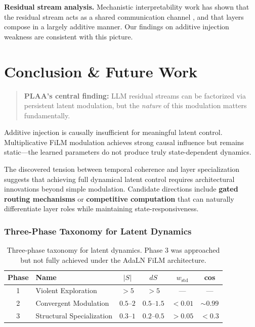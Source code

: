 \documentclass[11pt,a4paper]{article}
\begin{document}
\textbf{Residual stream analysis.} Mechanistic interpretability work has shown that
the residual stream acts as a shared communication channel \cite{elhage2021mathematical},
and that layers compose in a largely additive manner. Our findings on additive
injection weakness are consistent with this picture.

\section{Conclusion \& Future Work}

\begin{quote}
  \textbf{PLAA's central finding:} LLM residual streams can be factorized via
  persistent latent modulation, but the \emph{nature} of this modulation matters
  fundamentally.
\end{quote}

Additive injection is causally insufficient for meaningful latent control.
Multiplicative FiLM modulation achieves strong causal influence but remains
static---the learned parameters do not produce truly state-dependent dynamics.

The discovered tension between temporal coherence and layer specialization suggests
that achieving full dynamical latent control requires architectural innovations beyond
simple modulation. Candidate directions include \textbf{gated routing mechanisms} or
\textbf{competitive computation} that can naturally differentiate layer roles while
maintaining state-responsiveness.

\subsubsection*{Three-Phase Taxonomy for Latent Dynamics}

\begin{table}[h]
\centering
\begin{tabular}{clcccc}
\toprule
\textbf{Phase} & \textbf{Name} & $|S|$ & $dS$ & $w_{\mathrm{std}}$ & \textbf{cos} \\
\midrule
1 & Violent Exploration    & $>5$        & $>5$         & ---      & ---         \\
2 & Convergent Modulation  & $0.5$--$2$  & $0.5$--$1.5$ & $<0.01$  & $\sim 0.99$ \\
3 & Structural Specialization & $0.3$--$1$ & $0.2$--$0.5$ & $>0.05$ & $<0.3$    \\
\bottomrule
\end{tabular}
\caption{Three-phase taxonomy for latent dynamics. Phase 3 was approached but not
fully achieved under the AdaLN FiLM architecture.}
\end{table}
\end{document}
